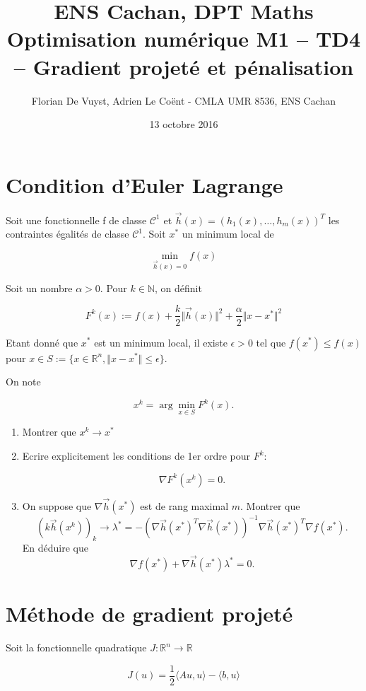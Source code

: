 \documentclass[11pt, a4paper]{article}
\title{ENS Cachan, DPT Maths \\ [1cm]
Optimisation numérique M1 -- TD4 -- Gradient projeté et pénalisation}
\date{13 octobre 2016}
\author{Florian De Vuyst, Adrien Le Co\"ent - CMLA UMR 8536, ENS Cachan}
\begin{document}
%
\maketitle
%

\section{Condition d'Euler Lagrange}

Soit une fonctionnelle f de classe $\mathcal{C}^1$ et $\vec{h}(x) = (h_1(x), \dots , h_m(x))^T$ les contraintes égalités de classe $\mathcal{C}^1$.
Soit $x^*$ un minimum local de 

$$ \displaystyle\min_{\vec{h}(x)=0}f(x)$$

Soit un nombre $\alpha > 0$. Pour $k \in \mathbb{N}$, on définit

$$ F^k(x) := f(x) + \frac{k}{2}\Vert \vec{h}(x)\Vert^2 + \frac{\alpha}{2}\Vert x-x^*\Vert^2$$

Etant donné que $x^*$ est un minimum local, il existe $\epsilon > 0$ tel que $f(x^*) \leq f(x)$ pour $x \in S:= \{ x\in \mathbb{R}^n, \Vert x-x^*\Vert \leq \epsilon \}$.

On note 

$$ \displaystyle x^k = \arg\min_{x \in S} F^k(x).$$

\begin{enumerate}
\item Montrer que $x^k \rightarrow x^*$
\item Ecrire explicitement les conditions de 1er ordre pour $F^k$:

$$ \nabla F^k(x^k) = 0.$$

\item On suppose que $\nabla \vec{h} (x^*)$ est de rang maximal $m$. Montrer que 
$$ (k\vec{h}(x^k))_k \rightarrow \lambda^* = -(\nabla \vec{h} (x^*)^T \nabla \vec{h}(x^*))^{-1} \nabla \vec{h}(x^*)^T \nabla f(x^*).$$
En déduire que 
$$ \nabla f(x^*) + \nabla \vec{h} (x^*)\lambda^* = 0.$$
\end{enumerate}


\medskip
\section{Méthode de gradient projeté}

Soit la fonctionnelle quadratique $J:\mathbb{R}^n \rightarrow \mathbb{R}$

 $$ J(u) = \frac{1}{2}\langle Au,u \rangle - \langle b,u \rangle$$
 
\end{document}
